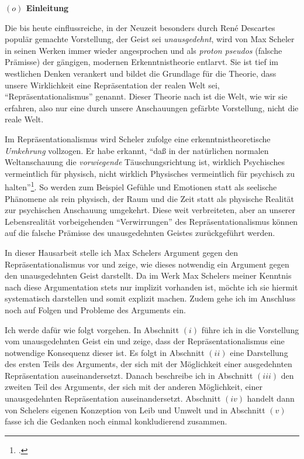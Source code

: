 \documentclass[a4paper, 12pt]{article}
\begin{document}
\begin{onehalfspace} 

\noindent\textbf{$(o)$ Einleitung}

\noindent Die bis heute einflussreiche, in der Neuzeit besonders durch Ren\'e Descartes populär gemachte Vorstellung, der Geist sei \emph{unausgedehnt}, wird von Max Scheler in seinen Werken immer wieder angesprochen und als \emph{proton pseudos} (falsche Prämisse) der gängigen, modernen Erkenntnistheorie entlarvt. Sie ist tief im westlichen Denken verankert und bildet die Grundlage für die Theorie, dass unsere Wirklichkeit eine Repräsentation der realen Welt sei, "`Repräsentationalismus"' genannt. Dieser Theorie nach ist die Welt, wie wir sie erfahren, also nur eine durch unsere Anschauungen gefärbte Vorstellung, nicht die reale Welt.

Im Repräsentationalismus wird Scheler zufolge eine erkenntnistheoretische \emph{Umkehrung} vollzogen. Er habe erkannt, "`daß in der natürlichen normalen Weltanschauung die \emph{vorwiegende} Täuschungsrichtung ist, wirklich Psychisches vermeintlich für physisch, nicht wirklich Physisches vermeintlich für psychisch zu halten"'\footnote{\Cite[Siehe][S. 257]{scheler-idole}.}. So werden zum Beispiel Gefühle und Emotionen statt als seelische Phänomene als rein physisch, der Raum und die Zeit statt als physische Realität zur psychischen Anschauung umgekehrt. Diese weit verbreiteten, aber an unserer Lebensrealität vorbeigehenden "`Verwirrungen"' des Repräsentationalismus können auf die falsche Prämisse des unausgedehnten Geistes zurück\-geführt werden. 

In dieser Hausarbeit stelle ich Max Schelers Argument gegen den Repräsentationalismus vor und zeige, wie dieses notwendig ein Argument gegen den unausgedehnten Geist darstellt. Da im Werk Max Schelers meiner Kenntnis nach diese Argumentation stets nur implizit vorhanden ist, möchte ich sie hiermit systematisch darstellen und somit explizit machen. Zudem gehe ich im Anschluss noch auf Folgen und Probleme des Arguments ein. 

\vspace{3mm}

Ich werde dafür wie folgt vorgehen. In Abschnitt $(i)$ führe ich in die Vorstellung vom unausgedehnten Geist ein und zeige, dass der Repräsentationalismus eine notwendige Konsequenz dieser ist. Es folgt in Abschnitt $(ii)$ eine Darstellung des ersten Teils des Arguments, der sich mit der Möglichkeit einer ausgedehnten Repräsentation auseinandersetzt. Danach beschreibe ich in Abschnitt $(iii)$ den zweiten Teil des Arguments, der sich mit der anderen Möglichkeit, einer unausgedehnten Repräsentation auseinandersetzt. Abschnitt $(iv)$ handelt dann von Schelers eigenen Konzeption von Leib und Umwelt und in Abschnitt $(v)$ fasse ich die Gedanken noch einmal konkludierend zusammen.


\end{onehalfspace}
\end{document}
